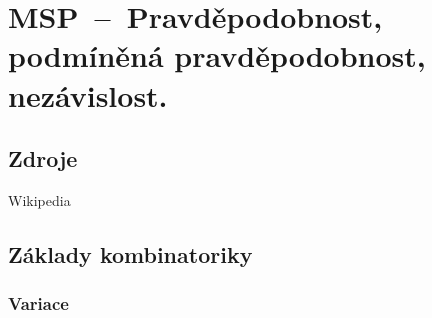 

\graphicspath{{msp/pravdepodobnost/figures}}


\chapter{MSP~--~Pravděpodobnost, podmíněná pravděpodobnost, nezávislost.}


\section{Zdroje}

\begin{compactitem}
    \item {}
    \item {}
    \item Wikipedia
\end{compactitem}





\section{Základy kombinatoriky}

\subsection{Variace}

